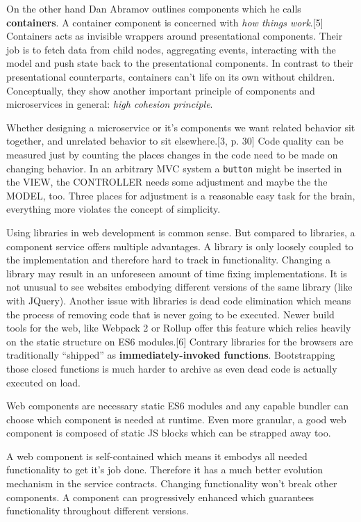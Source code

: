 \documentclass[]{assets/latex/ieee}
\begin{document}
On the other hand Dan Abramov outlines components which he calls
\textbf{containers}. A container component is concerned with \emph{how
things work}.{[}5{]} Containers acts as invisible wrappers around
presentational components. Their job is to fetch data from child nodes,
aggregating events, interacting with the model and push state back to
the presentational components. In contrast to their presentational
counterparts, containers can't life on its own without children.
Conceptually, they show another important principle of components and
microservices in general: \emph{high cohesion principle}.

Whether designing a microservice or it's components we want related
behavior sit together, and unrelated behavior to sit elsewhere.{[}3, p.
30{]} Code quality can be measured just by counting the places changes
in the code need to be made on changing behavior. In an arbitrary MVC
system a \texttt{button} might be inserted in the VIEW, the CONTROLLER
needs some adjustment and maybe the the MODEL, too. Three places for
adjustment is a reasonable easy task for the brain, everything more
violates the concept of simplicity.

Using libraries in web development is common sense. But compared to
libraries, a component service offers multiple advantages. A library is
only loosely coupled to the implementation and therefore hard to track
in functionality. Changing a library may result in an unforeseen amount
of time fixing implementations. It is not unusual to see websites
embodying different versions of the same library (like with JQuery).
Another issue with libraries is dead code elimination which means the
process of removing code that is never going to be executed. Newer build
tools for the web, like Webpack 2 or Rollup offer this feature which
relies heavily on the static structure on ES6 modules.{[}6{]} Contrary
libraries for the browsers are traditionally ``shipped'' as
\textbf{immediately-invoked functions}. Bootstrapping those closed
functions is much harder to archive as even dead code is actually
executed on load.

Web components are necessary static ES6 modules and any capable bundler
can choose which component is needed at runtime. Even more granular, a
good web component is composed of static JS blocks which can be strapped
away too.

A web component is self-contained which means it embodys all needed
functionality to get it's job done. Therefore it has a much better
evolution mechanism in the service contracts. Changing functionality
won't break other components. A component can progressively enhanced
which guarantees functionality throughout different versions.
\end{document}
